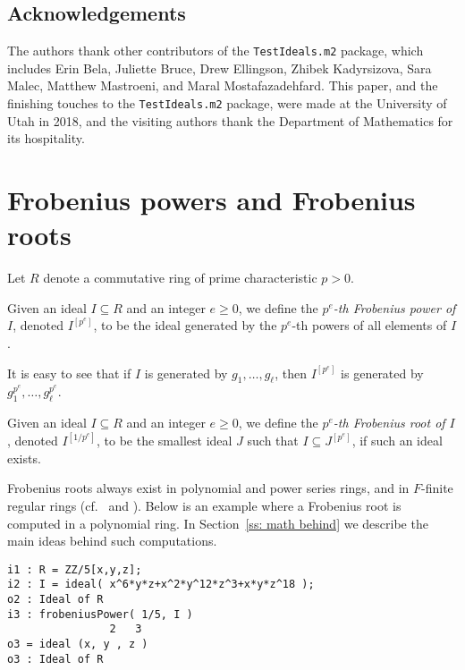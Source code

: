 \documentclass{amsart}
\begin{document}
\subsection*{Acknowledgements}
The authors thank other contributors of the \texttt{TestIdeals.m2} package, which includes
Erin Bela, Juliette Bruce, Drew Ellingson, Zhibek Kadyrsizova, Sara Malec, Matthew Mastroeni, and Maral Mostafazadehfard.
This paper, and the finishing touches to the \texttt{TestIdeals.m2} package, were made at the University of Utah in 2018, and the visiting authors thank the Department of Mathematics for its hospitality.



\section{Frobenius powers and Frobenius roots}\label{Section: Frobenius powers and Frobenius roots}

Let $R$ denote a commutative ring of prime characteristic $p>0$.

\begin{definition}
Given an ideal $I\subseteq R$ and an integer $e\geq 0$, we define the \emph{$p^e$-th Frobenius power of $I$}, denoted $I^{[p^e]}$, to be the ideal
generated by the $p^e$-th powers of all elements of $I$.
\end{definition}

It is easy to see that if $I$ is generated by $g_1, \dots, g_\ell$, then $I^{[p^e]}$ is generated by $g_1^{p^e}, \dots, g_\ell^{p^e}$.


\begin{definition}
Given an ideal $I\subseteq R$ and an integer $e\geq 0$, we define the \emph{$p^e$-th Frobenius root of $I$}, denoted $I^{[1/p^{e}]}$, to be the smallest ideal $J$ such that $I\subseteq J^{[p^e]}$, if such an ideal exists.
\end{definition}

Frobenius roots always exist in polynomial and power series rings, and in $F$-finite regular rings
(cf.~\cite[\S 2]{BlickleMustataSmithDiscretenessAndRationalityOfFThresholds} and \cite[\S 5]{KatzmanParameterTestIdealOfCMRings}).
Below is an example where a Frobenius root is computed in a polynomial ring.
In Section~\ref{ss: math behind} we describe the main ideas behind such computations.

\medskip
\begin{verbatim}
i1 : R = ZZ/5[x,y,z];
i2 : I = ideal( x^6*y*z+x^2*y^12*z^3+x*y*z^18 );
o2 : Ideal of R
i3 : frobeniusPower( 1/5, I )
                2   3
o3 = ideal (x, y , z )
o3 : Ideal of R
\end{verbatim}
\medskip
\end{document}
